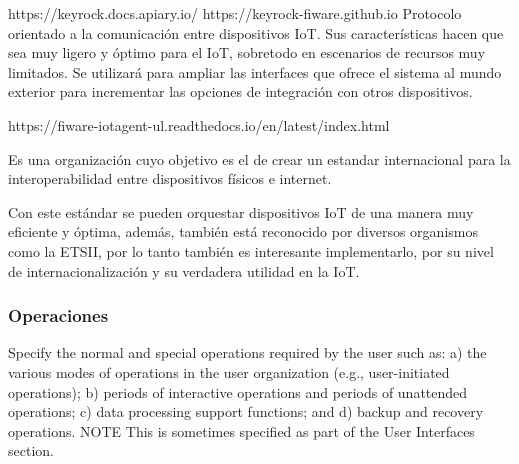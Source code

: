 \documentclass[12pt, a4paper, twoside]{article}
\begin{document}
https://keyrock.docs.apiary.io/
https://keyrock-fiware.github.io
Protocolo orientado a la comunicación entre dispositivos IoT.
Sus características hacen que sea muy ligero y óptimo para el IoT, sobretodo
en escenarios de recursos muy limitados.
Se utilizará para ampliar las interfaces que ofrece el sistema al mundo exterior
para incrementar las opciones de integración con otros dispositivos.

https://fiware-iotagent-ul.readthedocs.io/en/latest/index.html

Es una organización cuyo objetivo es el de crear un estandar internacional para la interoperabilidad
entre dispositivos físicos e internet.

Con este estándar se pueden orquestar dispositivos IoT de una manera muy eficiente y óptima, además,
también está reconocido por diversos organismos como la ETSII, por lo tanto también es interesante
implementarlo, por su nivel de internacionalización y su verdadera utilidad en la IoT.

\subsubsection{Operaciones}
Specify the normal and special operations required by the user such as:
a) the various modes of operations in the user organization (e.g., user-initiated operations);
b) periods of interactive operations and periods of unattended operations;
c) data processing support functions; and
d) backup and recovery operations.
NOTE This is sometimes specified as part of the User Interfaces section.
\end{document}
